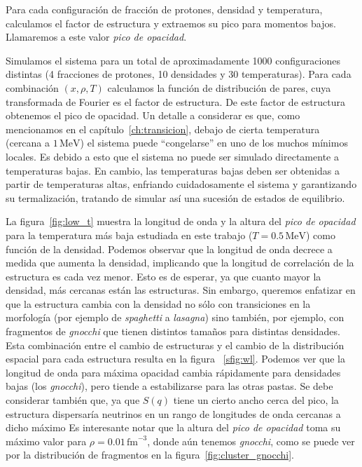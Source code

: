 Para cada configuración de fracción de protones, densidad y temperatura, calculamos el factor de estructura y extraemos su pico para momentos bajos.
Llamaremos a este valor \emph{pico de opacidad}.

Simulamos el sistema para un total de aproximadamente 1000 configuraciones distintas (4 fracciones de protones, 10 densidades y 30 temperaturas).
Para cada combinación $(x, \rho, T)$ calculamos la función de distribución de pares, cuya transformada de Fourier es el factor de estructura.
De este factor de estructura obtenemos el pico de opacidad.
Un detalle a considerar es que, como mencionamos en el capítulo~\ref{ch:transicion}, debajo de cierta temperatura (cercana a $1\,\text{MeV}$) el sistema puede ``congelarse'' en uno de los muchos mínimos locales.
Es debido a esto que el sistema no puede ser simulado directamente a temperaturas bajas.
En cambio, las temperaturas bajas deben ser obtenidas a partir de temperaturas altas, enfriando cuidadosamente el sistema y garantizando su termalización, tratando de simular así una sucesión de estados de equilibrio.

La figura~\ref{fig:low_t} muestra la longitud de onda y la altura del \emph{pico de opacidad} para la temperatura más baja estudiada en este trabajo ($T = 0.5\,\text{MeV}$) como función de la densidad.
Podemos observar que la longitud de onda decrece a medida que aumenta la densidad, implicando que la longitud de correlación de la estructura es cada vez menor.
Esto es de esperar, ya que cuanto mayor la densidad, más cercanas están las estructuras.
Sin embargo, queremos enfatizar en que la estructura cambia con la densidad no sólo con transiciones en la morfología (por ejemplo de \emph{spaghetti} a \emph{lasagna}) sino también, por ejemplo, con fragmentos de \emph{gnocchi} que tienen distintos tamaños para distintas densidades.
Esta combinación entre el cambio de estructuras y el cambio de la distribución espacial para cada estructura resulta en la figura ~\ref{sfig:wl}.
Podemos ver que la longitud de onda para máxima opacidad cambia rápidamente para densidades bajas (los \emph{gnocchi}), pero tiende a estabilizarse para las otras pastas.
Se debe considerar también que, ya que $S(q)$ tiene un cierto ancho cerca del pico, la estructura dispersaría neutrinos en un rango de longitudes de onda cercanas a dicho máximo
Es interesante notar que la altura del \emph{pico de opacidad} toma su máximo valor para $\rho = 0.01\,\text{fm}^{-3}$, donde aún tenemos \emph{gnocchi}, como se puede ver por la distribución de fragmentos en la figura~\ref{fig:cluster_gnocchi}.

